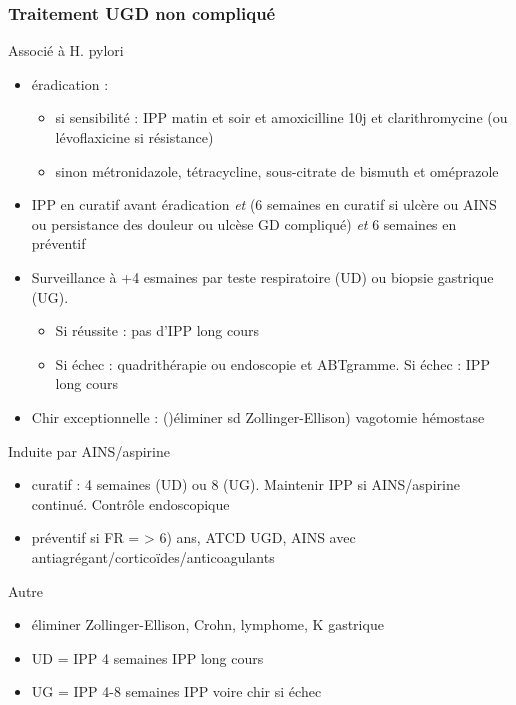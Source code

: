 \documentclass[11pt]{article}
\begin{document}
\subsubsection{Traitement UGD non compliqué}
\label{sec:org52cb0b0}
Associé à H. pylori 
\begin{itemize}
\item éradication : 
\begin{itemize}
\item si sensibilité : IPP matin et soir et amoxicilline 10j et clarithromycine (ou
lévoflaxicine si résistance)
\item sinon métronidazole, tétracycline, sous-citrate de bismuth et oméprazole
\end{itemize}
\item IPP en curatif avant éradication \emph{et} (6 semaines en curatif si ulcère ou AINS
ou persistance des douleur ou ulcèse GD compliqué) \emph{et} 6 semaines en préventif
\item Surveillance à +4 esmaines par teste respiratoire (UD) ou biopsie gastrique
(UG). 
\begin{itemize}
\item Si réussite : pas d'IPP long cours
\item Si échec : quadrithérapie ou endoscopie et ABTgramme. Si échec : IPP long
cours
\end{itemize}
\item Chir exceptionnelle : ()éliminer sd Zollinger-Ellison) vagotomie \textpm{} hémostase
\end{itemize}

Induite par AINS/aspirine
\begin{itemize}
\item curatif : 4 semaines (UD) ou 8 (UG). Maintenir IPP si AINS/aspirine
continué. Contrôle endoscopique
\item préventif si FR = > 6) ans, ATCD UGD, AINS avec antiagrégant/corticoïdes/anticoagulants
\end{itemize}
Autre
\begin{itemize}
\item éliminer Zollinger-Ellison, Crohn, lymphome, K gastrique
\item UD = IPP 4 semaines \textpm{} IPP long cours
\item UG = IPP 4-8 semaines \textpm{} IPP voire chir si échec
\end{itemize}
\end{document}

